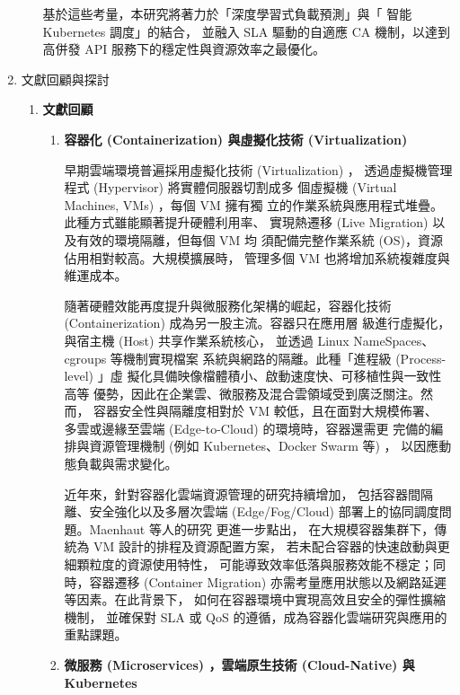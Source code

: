 \documentclass[12pt,a4paper]{article}
\begin{document}
\begin{enumerate}[label={(\zhdig*)}, leftmargin=2\parindent, listparindent=\parindent]
\begin{enumerate}[label={(\arabic*)}, leftmargin=\parindent, listparindent=\parindent]
\begin{itemize}[leftmargin=\parindent, listparindent=\parindent]
\end{itemize}

基於這些考量，本研究將著力於「深度學習式負載預測」與「 智能 Kubernetes 調度」的結合，
並融入 SLA 驅動的自適應 CA 機制，以達到高併發 API 服務下的穩定性與資源效率之最優化。

\end{enumerate}
\item 文獻回顧與探討

\begin{enumerate}[label={(\arabic*)}, leftmargin=\parindent, listparindent=\parindent]
\item \textbf{文獻回顧}
\begin{enumerate}[label={(\zhdig*)}, leftmargin=2\parindent, listparindent=\parindent]

\item\textbf{容器化 (Containerization) \cite{9}與虛擬化技術
    (Virtualization) \cite{8}}

早期雲端環境普遍採用虛擬化技術 (Virtualization) ，
透過虛擬機管理程式 (Hypervisor) 將實體伺服器切割成多
個虛擬機 (Virtual Machines, VMs) ，每個 VM 擁有獨
立的作業系統與應用程式堆疊。此種方式雖能顯著提升硬體利用率、
實現熱遷移 (Live Migration) 以及有效的環境隔離，但每個 VM 均
須配備完整作業系統 (OS)，資源佔用相對較高。大規模擴展時，
管理多個 VM 也將增加系統複雜度與維運成本。

隨著硬體效能再度提升與微服務化架構的崛起，容器化技術
(Containerization) 成為另一股主流。容器只在應用層
級進行虛擬化，與宿主機 (Host) 共享作業系統核心，
並透過 Linux NameSpaces、cgroups 等機制實現檔案
系統與網路的隔離。此種「進程級 (Process-level) 」虛
擬化具備映像檔體積小、啟動速度快、可移植性與一致性高等
優勢，因此在企業雲、微服務及混合雲領域受到廣泛關注。然而，
容器安全性與隔離度相對於 VM 較低，且在面對大規模佈署、
多雲或邊緣至雲端 (Edge-to-Cloud) 的環境時，容器還需更
完備的編排與資源管理機制 (例如 Kubernetes、Docker Swarm 等) ，
以因應動態負載與需求變化。

近年來，針對容器化雲端資源管理的研究持續增加，
包括容器間隔離、安全強化以及多層次雲端 (Edge/Fog/Cloud)
部署上的協同調度問題。Maenhaut 等人的研究\cite{20} 更進一步點出，
在大規模容器集群下，傳統為 VM 設計的排程及資源配置方案，
若未配合容器的快速啟動與更細顆粒度的資源使用特性，
可能導致效率低落與服務效能不穩定；同時，容器遷移 (Container Migration)
亦需考量應用狀態以及網路延遲等因素。在此背景下，
如何在容器環境中實現高效且安全的彈性擴縮機制，
並確保對 SLA 或 QoS 的遵循，成為容器化雲端研究與應用的重點課題。

\item\textbf{
微服務 (Microservices) \cite{10}，雲端原生技術 (Cloud-Native) 與 Kubernetes
}


\end{enumerate}
\end{enumerate}
\end{enumerate}
\end{document}
